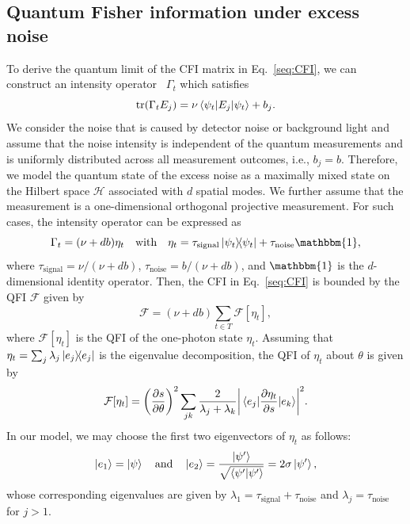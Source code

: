 \documentclass[aps,pra,10pt,showpacs,amsmath,amssymb,floatfix,superscriptaddress,twocolumn]{revtex4-2}
\begin{document}
\subsection{Quantum Fisher information under excess noise}
To derive the quantum limit of the CFI matrix in Eq.~\eqref{seq:CFI}, we can construct an intensity operator~\cite{supp_Tsang2021} \(\Gamma_t\) which satisfies
\begin{equation}
    \tr(\Gamma_t E_j) = \nu\ev{E_j}{\psi_t} + b_j.
\end{equation}
We consider the noise that is caused by detector noise or background light and assume that the noise intensity is independent of the quantum measurements and is uniformly distributed across all measurement outcomes, i.e., \(b_j=b\).
Therefore, we model the quantum state of the excess noise as a maximally mixed state on the Hilbert space \(\mathcal H\) associated with \(d\) spatial modes.
We further assume that the measurement is a one-dimensional orthogonal projective measurement.
For such cases, the intensity operator can be expressed as
\begin{equation}
    \Gamma_t = (\nu + d b) \eta_t
    \qq{with}
    \eta_t = \tau_\mathrm{signal} \op{\psi_t} + \tau_\mathrm{noise} \mathbbm{1},
\end{equation}
where \(\tau_\mathrm{signal} = \nu / (\nu + d b)\), \(\tau_\mathrm{noise} = b / (\nu + d b)\), and \(\mathbbm{1}\) is the \(d\)-dimensional identity operator.
Then, the CFI in Eq.~\eqref{seq:CFI} is bounded by the QFI \(\mathcal F\) given by
\begin{equation}
    \mathcal F = (\nu + d b) \sum_{t \in T} \mathcal F[\eta_t],
\end{equation}
where \(\mathcal F[\eta_t]\) is the QFI of the one-photon state \(\eta_t\).
Assuming that \(\eta_t = \sum_j \lambda_j \op{e_j}\) is the eigenvalue decomposition, the QFI of \(\eta_t\) about \(\theta\) is given by~\cite{supp_Liu2020}
\begin{equation}
    \mathcal F[\eta_t] = \qty(\pdv{s}{\theta})^2 \sum_{jk} \frac{2}{\lambda_j+\lambda_k} \qty|\mel{e_j}{\pdv{\eta_t}{s}}{e_k}|^2.
\end{equation}
In our model, we may choose the first two eigenvectors of \(\eta_t\) as follows:
\begin{equation}
    \ket{e_1} = \ket{\psi}\qand\ket{e_2}=\frac{\ket{\psi'}}{\sqrt{\ip{\psi'}}}=2\sigma\ket{\psi'},
\end{equation}
whose corresponding eigenvalues are given by \(\lambda_1 = \tau_\mathrm{signal} + \tau_\mathrm{noise}\) and \(\lambda_j=\tau_\mathrm{noise}\) for \(j>1\).
\end{document}
